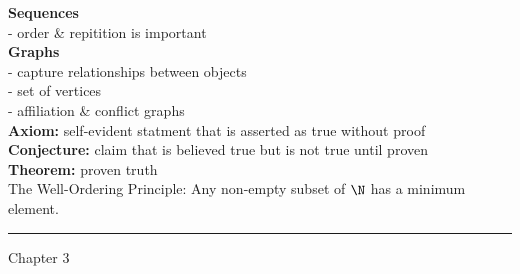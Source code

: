 \documentclass[12pt, letterpaper]{article}
\begin{document}
\begin{multicols}{2}
{\begin{minipage}{23em}
\begin{enumerate}
  \end{enumerate}
\end{minipage}}
\textbf{Sequences} \\
- order \& repitition is important \\
\textbf{Graphs} \\
- capture relationships between objects \\
- set of vertices \\
- affiliation \& conflict graphs \\
\textbf{Axiom:} self-evident statment that is asserted as true without proof \\
\textbf{Conjecture:} claim that is believed true but is not true until proven \\
\textbf{Theorem:} proven truth \\
The Well-Ordering Principle: Any non-empty subset of $\N$ has a minimum element. \\
\rule[0.5ex]{\linewidth}{1pt}

Chapter 3



\end{multicols}
\end{document}

